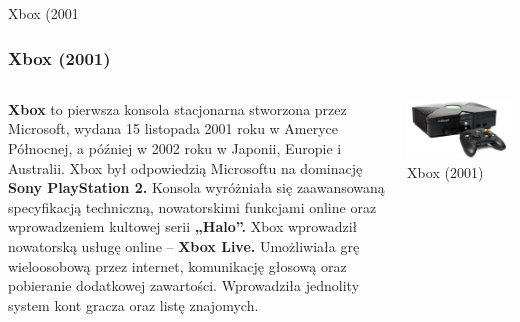 \documentclass[8pt]{beamer}
\begin{document}
\begin{frame}{Xbox (2001}
\frametitle{Xbox (2001)}
\begin{columns}

\begin{column}{0.6\textwidth}
\textbf {Xbox} to pierwsza konsola stacjonarna stworzona przez Microsoft, wydana 15 listopada 2001 roku w Ameryce Północnej, a później w 2002 roku w Japonii, Europie i Australii. 
\vspace{0.5em}
Xbox był odpowiedzią Microsoftu na dominację \textbf {Sony PlayStation 2.} Konsola wyróżniała się zaawansowaną specyfikacją techniczną, nowatorskimi funkcjami online oraz wprowadzeniem kultowej serii \textbf {„Halo”.}
\vspace{0.5em}
Xbox wprowadził nowatorską usługę online – \textbf {Xbox Live.}
Umożliwiała grę wieloosobową przez internet, komunikację głosową oraz pobieranie dodatkowej zawartości. Wprowadziła jednolity system kont gracza oraz listę znajomych.
\end{column}

\begin{column}{0.35\textwidth}
        \centering
        \includegraphics[width=\textwidth]{xbox.jpg} 
        {\small Xbox (2001)} 
    \end{column}
\end{columns}

\end{frame}
\end{document}
